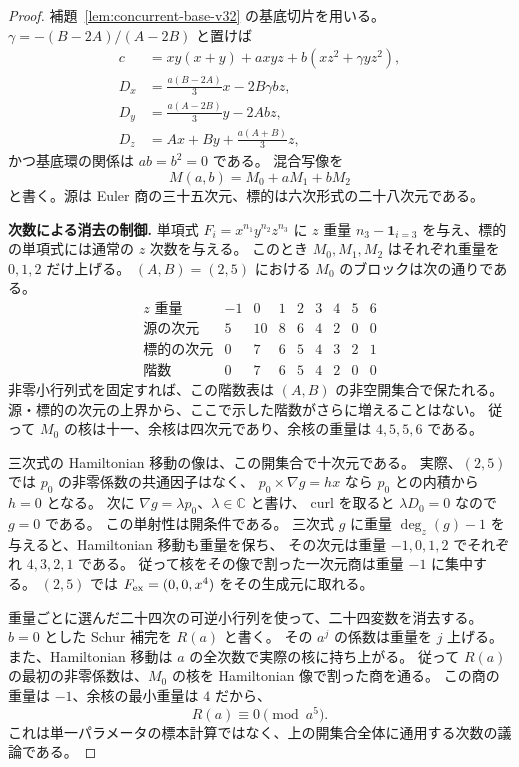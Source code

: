 \begin{proof}
補題~\ref{lem:concurrent-base-v32} の基底切片を用いる。
$\gamma=-(B-2A)/(A-2B)$ と置けば
\begin{align*}
 c&=xy(x+y)+a xyz+b(xz^2+\gamma yz^2),\\
 D_x&=\frac{a(B-2A)}3x-2B\gamma b z,\\
 D_y&=\frac{a(A-2B)}3y-2Abz,\\
 D_z&=Ax+By+\frac{a(A+B)}3z,
\end{align*}
かつ基底環の関係は $ab=b^2=0$ である。
混合写像を
\[
 M(a,b)=M_0+aM_1+bM_2
\]
と書く。源は Euler 商の三十五次元、標的は六次形式の二十八次元である。

\smallskip\noindent
\textbf{次数による消去の制御.}
単項式 $F_i=x^{n_1}y^{n_2}z^{n_3}$ に
$z$ 重量 $n_3-\mathbf 1_{i=3}$ を与え、標的の単項式には通常の $z$ 次数を与える。
このとき $M_0,M_1,M_2$ はそれぞれ重量を $0,1,2$ だけ上げる。
$(A,B)=(2,5)$ における $M_0$ のブロックは次の通りである。
\[
 \begin{array}{c|rrrrrrrr}
 z\text{ 重量}&-1&0&1&2&3&4&5&6\\\hline
 \text{源の次元}&5&10&8&6&4&2&0&0\\
 \text{標的の次元}&0&7&6&5&4&3&2&1\\
 \text{階数}&0&7&6&5&4&2&0&0
 \end{array}
\]
非零小行列式を固定すれば、この階数表は $(A,B)$ の非空開集合で保たれる。
源・標的の次元の上界から、ここで示した階数がさらに増えることはない。
従って $M_0$ の核は十一、余核は四次元であり、余核の重量は $4,5,5,6$ である。

三次式の Hamiltonian 移動の像は、この開集合で十次元である。
実際、$(2,5)$ では $p_0$ の非零係数の共通因子はなく、
$p_0\times\nabla g=hx$ なら $p_0$ との内積から $h=0$ となる。
次に $\nabla g=\lambda p_0$、$\lambda\in\mathbb C$ と書け、
curl を取ると $\lambda D_0=0$ なので $g=0$ である。
この単射性は開条件である。
三次式 $g$ に重量 $\deg_z(g)-1$ を与えると、Hamiltonian 移動も重量を保ち、
その次元は重量 $-1,0,1,2$ でそれぞれ $4,3,2,1$ である。
従って核をその像で割った一次元商は重量 $-1$ に集中する。
$(2,5)$ では $F_{\rm ex}=(0,0,x^4)$ をその生成元に取れる。

重量ごとに選んだ二十四次の可逆小行列を使って、二十四変数を消去する。
$b=0$ とした Schur 補完を $R(a)$ と書く。
その $a^j$ の係数は重量を $j$ 上げる。
また、Hamiltonian 移動は $a$ の全次数で実際の核に持ち上がる。
従って $R(a)$ の最初の非零係数は、$M_0$ の核を Hamiltonian 像で割った商を通る。
この商の重量は $-1$、余核の最小重量は $4$ だから、
\[
 R(a)\equiv0\pmod{a^5}.
\]
これは単一パラメータの標本計算ではなく、上の開集合全体に通用する次数の議論である。


\end{proof}
